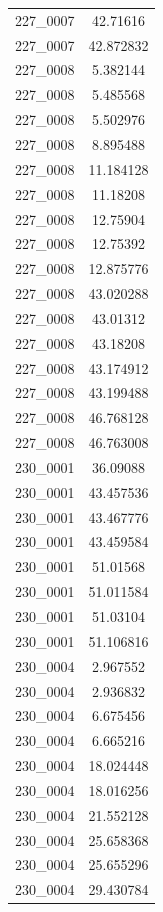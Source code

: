 \begin{table}[H]
\begin{tabular}{|c|c|}
        227\_0007 & 42.71616 \\
        227\_0007 & 42.872832 \\
        227\_0008 & 5.382144 \\
        227\_0008 & 5.485568 \\
        227\_0008 & 5.502976 \\
        227\_0008 & 8.895488 \\
        227\_0008 & 11.184128 \\
        227\_0008 & 11.18208 \\
        227\_0008 & 12.75904 \\
        227\_0008 & 12.75392 \\
        227\_0008 & 12.875776 \\
        227\_0008 & 43.020288 \\
        227\_0008 & 43.01312 \\
        227\_0008 & 43.18208 \\
        227\_0008 & 43.174912 \\
        227\_0008 & 43.199488 \\
        227\_0008 & 46.768128 \\
        227\_0008 & 46.763008 \\
        230\_0001 & 36.09088 \\
        230\_0001 & 43.457536 \\
        230\_0001 & 43.467776 \\
        230\_0001 & 43.459584 \\
        230\_0001 & 51.01568 \\
        230\_0001 & 51.011584 \\
        230\_0001 & 51.03104 \\
        230\_0001 & 51.106816 \\
        230\_0004 & 2.967552 \\
        230\_0004 & 2.936832 \\
        230\_0004 & 6.675456 \\
        230\_0004 & 6.665216 \\
        230\_0004 & 18.024448 \\
        230\_0004 & 18.016256 \\
        230\_0004 & 21.552128 \\
        230\_0004 & 25.658368 \\
        230\_0004 & 25.655296 \\
        230\_0004 & 29.430784 \\

\end{tabular}
\end{table}
